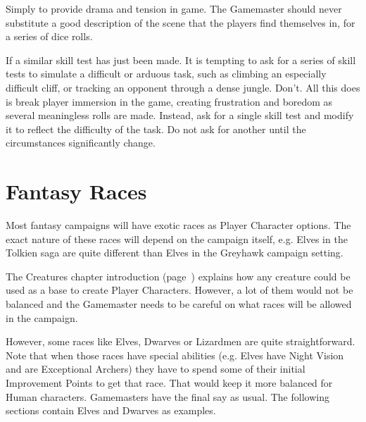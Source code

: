 Simply to provide drama and tension in game. The Gamemaster should never substitute a good description of the scene that the players find themselves in, for a series of dice rolls.  

If a similar skill test has just been made. It is tempting to ask for a series of skill tests to simulate a difficult or arduous task, such as climbing an especially difficult cliff, or tracking an opponent through a dense jungle. Don’t. All this does is break player immersion in the game, creating frustration and boredom as several meaningless rolls are made. Instead, ask for a single skill test and modify it to reflect the difficulty of the task. Do not ask for another until the circumstances significantly change.




\section{Fantasy Races}
Most fantasy campaigns will have exotic races as Player Character options. The exact nature of these races will depend on the campaign itself, e.g. Elves in the Tolkien saga are quite different than Elves in the Greyhawk campaign setting.

The Creatures chapter introduction (page~\pageref{ch:creatures}) explains how any creature could be used as a base to create Player Characters. However, a lot of them would not be balanced and the Gamemaster needs to be careful on what races will be allowed in the campaign.

However, some races like Elves, Dwarves or Lizardmen are quite straightforward. Note that when those races have special abilities (e.g. Elves have Night Vision and are Exceptional Archers) they have to spend some of their initial Improvement Points to get that race. That would keep it more balanced for Human characters. Gamemasters have the final say as usual. The following sections contain Elves and Dwarves as examples. 

